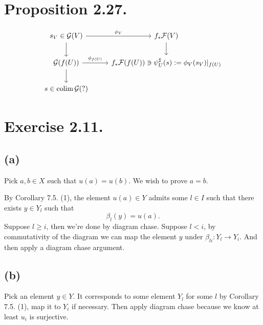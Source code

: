 \section{Proposition 2.27.}

\[\begin{tikzcd}
	{s_V\in\mathcal G(V)} & {f_{\ast}\mathcal F(V)} \\
	{\mathcal G(f(U))} & {f_{\ast}\mathcal F(f(U))\ni \psi_U^{\sharp}(s):=\phi_V(s_V)\vert_{f(U)}} \\
	{s\in\operatorname{colim}\mathcal G(?)}
	\arrow["{\phi_V}", from=1-1, to=1-2]
	\arrow["{\phi_{f(U)}}", from=2-1, to=2-2]
	\arrow[from=1-1, to=2-1]
	\arrow[from=2-1, to=3-1]
	\arrow[from=1-2, to=2-2]
\end{tikzcd}\]

\section{Exercise 2.11.}

\subsection{(a)}

Pick $a,b\in X$ such that $u(a)=u(b)$. We wish to prove $a=b$. 

By \cite{altman2013term} Corollary 7.5. (1), the element $u(a)\in Y$ admits some $l\in I$ such that there exists $y\in Y_l$ such that \[\beta_l(y)=u(a).\]
Suppose $l\geq i$, then we're done by diagram chase.
Suppose $l<i$, by commutativity of the diagram we can map the element $y$ under $\beta_{li}:Y_l\to Y_i$. And then apply a diagram chase argument. 

\subsection{(b)}

Pick an element $y\in Y$. It corresponds to some element $Y_l$ for some $l$ by Corollary 7.5. (1), map it to $Y_i$ if necessary. Then apply diagram chase because we know at least $u_i$ is surjective.